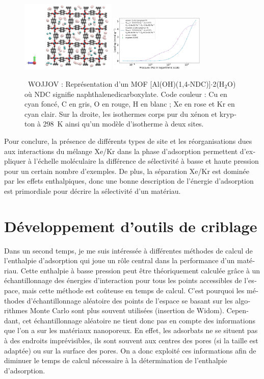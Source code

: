 \documentclass[thesis]{subfiles}
\begin{document}
\begin{otherlanguage}{french}
\begin{figure}[h]
\centering
  \includegraphics[width=0.4\textwidth]{figures/2-thermo/WOJJOV_clean.jpg}
  \includegraphics[width=0.4\textwidth]{figures/2-thermo/WOJJOV_clean_isotherm_xenon_krypton_298K.jpg}
  \caption{\small{\ WOJJOV : Représentation d'un MOF [Al(OH)(1,4-NDC)]$\cdot$2(H$_2$O) où NDC signifie naphthalenedicarboxylate. Code couleur : Cu en cyan foncé, C en gris, O en rouge, H en blanc ; Xe en rose et Kr en cyan clair. Sur la droite, les isothermes corps pur du xénon et krypton à \SI{298}{\kelvin} ainsi qu'un modèle d'isotherme à deux sites.}}
  \label{WOJJOV_resume}
\end{figure}

Pour conclure, la présence de différents types de site et les réorganisations dues aux interactions du mélange Xe/Kr dans la phase d'adsorption permettent d'expliquer à l'échelle moléculaire la différence de sélectivité à basse et haute pression pour un certain nombre d'exemples. De plus, la séparation Xe/Kr est dominée par les effets enthalpiques, donc une bonne description de l'énergie d'adsorption est primordiale pour décrire la sélectivité d'un matériau.

\section*{Développement d'outils de criblage}

Dans un second temps, je me suis intéressée à différentes méthodes de calcul de l'enthalpie d'adsorption qui joue un rôle central dans la performance d'un matériau. Cette enthalpie à basse pression peut être théoriquement calculée grâce à un échantillonnage des énergies d'interaction pour tous les points accessibles de l'espace, mais cette méthode est coûteuse en temps de calcul. C'est pourquoi les méthodes d'échantillonnage aléatoire des points de l'espace se basant sur les algorithmes Monte Carlo sont plus souvent utilisées (insertion de Widom). Cependant, cet échantillonnage aléatoire ne tient donc pas en compte des informations que l'on a sur les matériaux nanoporeux. En effet, les adsorbats ne se situent pas à des endroits imprévisibles, ils sont souvent aux centres des pores (si la taille est adaptée) ou sur la surface des pores. On a donc exploité ces informations afin de diminuer le temps de calcul nécessaire à la détermination de l'enthalpie d'adsorption.


\end{otherlanguage}
\end{document}
